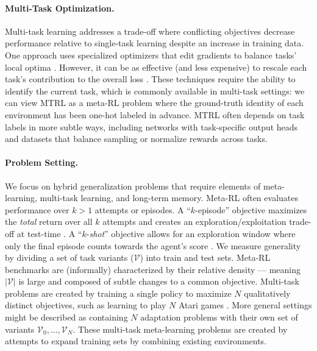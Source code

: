 \paragraph{Multi-Task Optimization.} Multi-task learning addresses a trade-off where conflicting objectives decrease performance relative to single-task learning despite an increase in training data. One approach uses specialized optimizers that edit gradients to balance tasks' local optima \cite{shaham2023causes, du2018adapting, yu2020gradient, li2021robust, wang2020gradient, liu2021conflict}. However, it can be as effective (and less expensive) to rescale each task's contribution to the overall loss \cite{xin2022current, hessel2019multi, royer2024scalarization, kurin2022defense, sodhani2021multi}. These techniques require the ability to identify the current task, which is commonly available in multi-task settings: we can view MTRL as a meta-RL problem where the ground-truth identity of each environment has been one-hot labeled in advance. MTRL often depends on task labels in more subtle ways, including networks with task-specific output heads \cite{kumar2022offline} and datasets that balance sampling \cite{d2024sharing} or normalize rewards \cite{garage} across tasks. 

\paragraph{Problem Setting.} We focus on hybrid generalization problems that require elements of meta-learning, multi-task learning, and long-term memory. Meta-RL often evaluates performance over $k > 1$ attempts or episodes. A ``$k$-episode'' objective maximizes the \textit{total} return over all $k$ attempts and creates an exploration/exploitation trade-off at test-time \cite{zintgraf2022fast}. A ``$k$-\textit{shot}'' objective allows for an exploration window where only the final episode counts towards the agent's score \cite{liu2021decoupling, stadie2018some}. We measure generality by dividing a set of task variants ($\mathcal{V}$) into train and test sets. Meta-RL benchmarks are (informally) characterized by their relative density --- meaning $|\mathcal{V}|$ is large and composed of subtle changes to a common objective. Multi-task problems are created by training a single policy to maximize $N$ qualitatively distinct objectives, such as learning to play $N$ Atari games  \cite{bellemare2013arcade}. More general settings might be described as containing $N$ adaptation problems with their own set of variants $\mathcal{V}_0, \dots, \mathcal{V}_N$. These multi-task meta-learning problems are created by attempts to expand training sets by combining existing environments.



